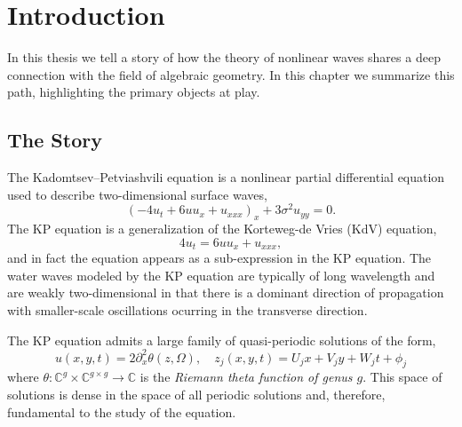 \chapter{Introduction} \label{ch:Introduction}

In this thesis we tell a story of how the theory of nonlinear waves shares a
deep connection with the field of algebraic geometry. In this chapter we
summarize this path, highlighting the primary objects at play.

\section{The Story} \label{sec:the-story}

The Kadomtsev--Petviashvili equation is a nonlinear partial differential
equation used to describe two-dimensional surface waves,
\begin{equation}
  \left( -4u_t + 6uu_x + u_{xxx} \right)_x + 3\sigma^2u_{yy} = 0.
\end{equation}
The KP equation is a generalization of the Korteweg-de Vries (KdV) equation,
\begin{equation}
  4u_t = 6uu_x + u_{xxx},
\end{equation}
and in fact the equation appears as a sub-expression in the KP equation. The
water waves modeled by the KP equation are typically of long wavelength and are
weakly two-dimensional in that there is a dominant direction of propagation with
smaller-scale oscillations ocurring in the transverse direction.

The KP equation admits a large family of quasi-periodic solutions of the form,
\begin{equation} \label{eq:finite-genus}
  u(x,y,t) = 2 \partial_x^2 \theta(z, \Omega),
  \quad
  z_j(x,y,t) = U_jx + V_jy + W_jt + \phi_j
\end{equation}
where $\theta : \mathbb{C}^g \times \mathbb{C}^{g \times g} \to \mathbb{C}$ is
the {\it Riemann theta function of genus $g$}. This space of solutions is dense
in the space of all periodic solutions and, therefore, fundamental to the study
of the equation.

